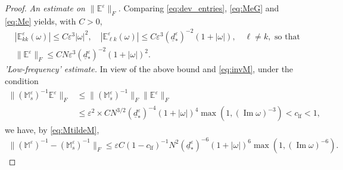 \documentclass[]{article}
\numberwithin{equation}{section}
\numberwithin{theorem}{section}
\numberwithin{lemma}{section}
\numberwithin{corollary}{section}
\numberwithin{proposition}{section}
\numberwithin{definition}{section}
\newcommand{\mypar}[1]{\noindent\textit{#1}\hspace{0.1em}}
\newcommand{\re}{\varepsilon}
\renewcommand{\Im}{\operatorname{Im}}
\begin{document}
\begin{proof}
		\mypar{An estimate on $\|\mathbb{E}^{\re}\|_F$.}
		Comparing \eqref{eq:dev_entries}, \eqref{eq:MeG} and \eqref{eq:Me} yields, with $C>0$, 
		\begin{align*}%
			&|\mathbb{E}^{\re}_{kk}(\omega)|\leq C \varepsilon^3 |\omega|^2, \quad 	|\mathbb{E}^{\re}_{\ell k}(\omega)|\leq C \varepsilon^3 (\underline{d}^{\re}_*)^{-2} (1+|\omega|), \quad \ell \neq k, \text{ so that }\\
			&\|\mathbb{E}^{\re} \|_F \leq CN\varepsilon^3 	(\underline{d}_*^{\re})^{-2} (1+|\omega|)^2.
		\end{align*}
		\mypar{'Low-frequency' estimate. }In view of the above bound and \eqref{eq:invM}, under the condition 
		\begin{equation}
			\label{eq:ME}
			\begin{aligned}
				\|(\mathbb{M}^{\re}_s)^{-1} \mathbb{E}^{\re}\|_F &\leq \| (\mathbb{M}^{\re}_s)^{-1} \|_F \| \mathbb{E}^{\re} \|_F \\
				&\leq \re^2 \times CN^{3/2} (\underline{d}_*^{\re})^{-4} (1+|\omega|)^4 \max(1, (\Im \omega)^{-3})<c_{\operatorname{lf}}<1,
			\end{aligned}
		\end{equation}
		we have, by \eqref{eq:MtildeM}, 
		\begin{align}
			\label{eq:MtildeM2}
			\| (\mathbb{M}^{\re})^{-1}-\left(\mathbb{{M}}^{\re}_s\right)^{-1}\|_F \leq \re C (1-c_{\operatorname{lf}})^{-1}N^{2} \left(\underline{d}_*^{\re}\right)^{-6} (1+|\omega|)^6 \max(1, (\Im \omega)^{-6}).
		\end{align}
		

\end{proof}
\end{document}
